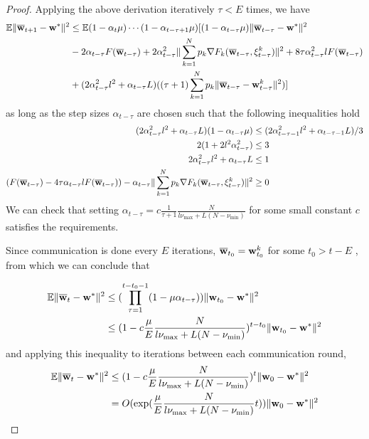 \begin{proof}
	Applying the above derivation iteratively $\tau<E$ times, we have
	\begin{align*}
	\mathbb{E}\|{\overline{\mathbf{w}}}_{t+1}-{\mathbf{w}}^{\ast}\|^{2} & \leq\mathbb{E}(1-\alpha_{t}\mu)\cdots(1-\alpha_{t-\tau+1}\mu)[(1-\alpha_{t-\tau}\mu)\|{\overline{\mathbf{w}}}_{t-\tau}-{\mathbf{w}}^{\ast}\|^{2}\\
	& -2\alpha_{t-\tau}F({\overline{\mathbf{w}}}_{t-\tau})+2\alpha_{t-\tau}^{2}\|\sum_{k=1}^{N}p_{k}\nabla F_{k}({\overline{\mathbf{w}}}_{t-\tau},\xi_{t-\tau}^{k})\|^{2}+8\tau\alpha_{t-\tau}^{2}lF({\overline{\mathbf{w}}}_{t-\tau})\\
	& +(2\alpha_{t-\tau}^{2}l^{2}+\alpha_{t-\tau}L)((\tau+1)\sum_{k=1}^{N}p_{k}\|{\overline{\mathbf{w}}}_{t-\tau}-{\mathbf{w}}_{t-\tau}^{k}\|^{2})]
	\end{align*}
	as long as the step sizes $\alpha_{t-\tau}$ are chosen such that
	the following inequalities hold 
	\begin{align*}
	(2\alpha_{t-\tau}^{2}l^{2}+\alpha_{t-\tau}L)(1-\alpha_{t-\tau}\mu) & \leq(2\alpha_{t-\tau-1}^{2}l^{2}+\alpha_{t-\tau-1}L)/3\\
	2(1+2l^{2}\alpha_{t-\tau}^{2}) & \leq3\\
	2\alpha_{t-\tau}^{2}l^{2}+\alpha_{t-\tau}L & \leq1\\
	(F({\overline{\mathbf{w}}}_{t-\tau})-4\tau\alpha_{t-\tau}lF({\overline{\mathbf{w}}}_{t-\tau}))-\alpha_{t-\tau}\|\sum_{k=1}^{N}p_{k}\nabla F_{k}({\overline{\mathbf{w}}}_{t-\tau},\xi_{t-\tau}^{k})\|^{2} & \geq0
	\end{align*}
	We can check that setting $\alpha_{t-\tau}=c\frac{1}{\tau+1}\frac{N}{l\nu_{\max}+L(N-\nu_{\min})}$
	for some small constant $c$ satisfies the requirements. 
	
	Since communication is done every $E$ iterations, ${\overline{\mathbf{w}}}_{t_{0}}={\mathbf{w}}_{t_{0}}^{k}$
	for some $t_{0}>t-E$ , from which we can conclude that 
	
	\begin{align*}
	\mathbb{E}\|{\overline{\mathbf{w}}}_{t}-{\mathbf{w}}^{\ast}\|^{2} & \leq(\prod_{\tau=1}^{t-t_{0}-1}(1-\mu\alpha_{t-\tau}))\|{\mathbf{w}}_{t_{0}}-{\mathbf{w}}^{\ast}\|^{2}\\
	& \leq(1-c\frac{\mu}{E}\frac{N}{l\nu_{\max}+L(N-\nu_{\min})})^{t-t_{0}}\|{\mathbf{w}}_{t_{0}}-{\mathbf{w}}^{\ast}\|^{2}
	\end{align*}
	and applying this inequality to iterations between each communication
	round, 
	\begin{align*}
	\mathbb{E}\|{\overline{\mathbf{w}}}_{t}-{\mathbf{w}}^{\ast}\|^{2} & \leq(1-c\frac{\mu}{E}\frac{N}{l\nu_{\max}+L(N-\nu_{\min})})^{t}\|{\mathbf{w}}_{0}-{\mathbf{w}}^{\ast}\|^{2}\\
	& =O(\exp(\frac{\mu}{E}\frac{N}{l\nu_{\max}+L(N-\nu_{\min})}t))\|{\mathbf{w}}_{0}-{\mathbf{w}}^{\ast}\|^{2}
	\end{align*}
	

\end{proof}
